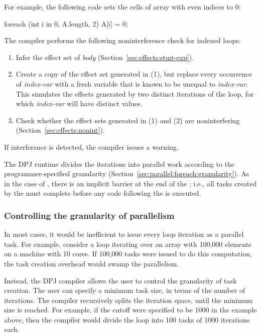 For example, the following code sets the cells of array  with
even indices to 0:

\begin{dpjlisting}
foreach (int i in 0, A.length, 2) {
  A[i] = 0;
}
\end{dpjlisting}

The compiler performs the following noninterference check for indexed
 loops:
\begin{enumerate}
\item Infer the effect set of \emph{body}
  (Section~\ref{sec:effects:stmt-exp}).
\item Create a copy of the effect set generated in (1), but replace
  every occurrence of \emph{index-var} with a fresh variable that is
  known to be unequal to \emph{index-var}.  This simulates the effects
  generated by two distinct iterations of the loop, for which
  \emph{index-var} will have distinct values.
\item Check whether the effect sets generated in (1) and (2) are
  noninterfering (Section~\ref{sec:effects:nonint}).
\end{enumerate}
If interference is detected, the compiler issues a warning.

The DPJ runtime divides the  iterations into parallel
work according to the programmer-specified granularity
(Section~\ref{sec:parallel:foreach:granularity}).  As in the case of
, there is an implicit barrier at the end of the
; i.e., all tasks created by the  must
complete before any code following the  is executed.

\subsubsection{Controlling the granularity of parallelism%
\label{sec:parallel:foreach:granularity}}

In most cases, it would be inefficient to issue every loop iteration
as a parallel task.  For example, consider a loop iterating over an
array with 100,000 elements on a machine with 10 cores.  If 100,000
tasks were issued to do this computation, the task creation overhead
would swamp the parallelism.

Instead, the DPJ compiler allows the user to control the granularity
of task creation.  The user can specify a minimum task size, in terms
of the number of iterations.  The compiler recursively splits the
iteration space, until the minimum size is reached.  For example, if
the cutoff were specified to be 1000 in the example above, then the
compiler would divide the loop into 100 tasks of 1000 iterations
each.

